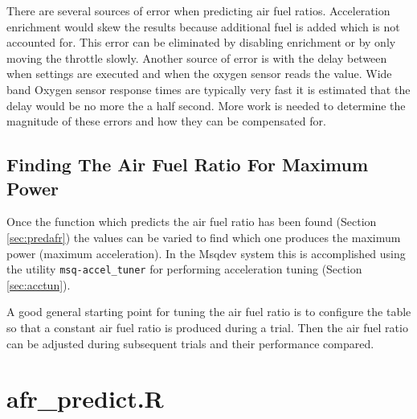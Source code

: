\documentclass{article}
\begin{document}
There are several sources of error when predicting air fuel ratios.
Acceleration enrichment would skew the results because additional
fuel is added which is not accounted for.
This error can be eliminated by disabling enrichment or by only
moving the throttle slowly.
Another source of error is with the delay between when settings are
executed and when the oxygen sensor reads the value.
Wide band Oxygen sensor response times are typically very fast it
is estimated that the delay would be no more the a half second.
More work is needed to determine the magnitude of these errors and
how they can be compensated for.

\FloatBarrier  %

\subsection{Finding The Air Fuel Ratio For Maximum Power}
\label{sec:findafrpow}

Once the function which predicts the air fuel ratio has been found
(Section \ref{sec:predafr}) the values can be varied to find which
one produces the maximum power (maximum acceleration).
In the Msqdev system this is accomplished using the utility
\verb+msq-accel_tuner+ for performing acceleration tuning (Section \ref{sec:acctun}).

A good general starting point for tuning the air fuel ratio is to
configure the table so that a constant air fuel ratio is produced
during a trial.
Then the air fuel ratio can be adjusted during subsequent trials and
their performance compared.

\appendix
\section{afr\_predict.R}
\label{app:afrpred}



\pagebreak


%
%
%

\end{document}
